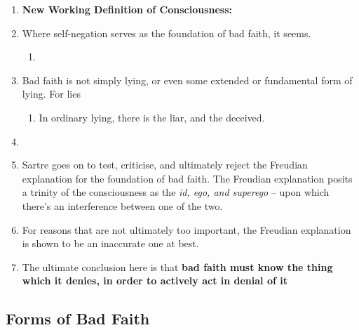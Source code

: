 \begin{enumerate}
  \item \textbf{New Working Definition of Consciousness:}  
  \item {} Where self-negation serves as the foundation of bad faith, it seems.
  \begin{enumerate}
    \item {}
  \end{enumerate}
  \item Bad faith is not simply lying, or even some extended or fundamental form of lying. For lies 
  \begin{enumerate}
    \item In ordinary lying, there is the liar, and the deceived.
  \end{enumerate}
  \item {}
  \item Sartre goes on to test, criticise, and ultimately reject the Freudian explanation for the foundation of bad faith. The Freudian explanation posits a trinity of the consciousness as the \emph{id, ego, and superego} -- upon which there's an interference between one of the two.
  \item For reasons that are not ultimately too important, the Freudian explanation is shown to be an inaccurate one at best.
  \item The ultimate conclusion here is that \textbf{bad faith must know the thing which it denies, in order to actively act in denial of it}
\end{enumerate}

\subsection{Forms of Bad Faith}

